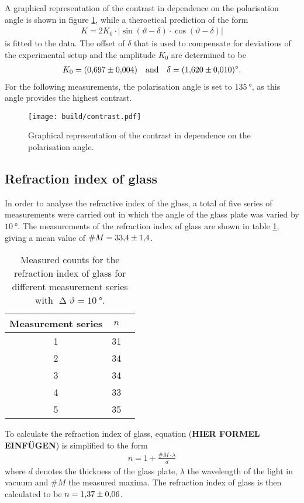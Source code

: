 \noindent
A graphical representation of the contrast in dependence on the polarisation angle is shown in figure \ref{fig:contrast}, while a theroetical prediction of the form
\begin{align}
    K = 2K_0\cdot|\sin(\vartheta-\delta)\cdot\cos(\vartheta-\delta)|
\end{align}
is fitted to the data.
The offset of $\delta$ that is used to compensate for deviations of the experimental setup and the amplitude $K_0$ are determined to be
\begin{align*}
    K_0=\SI{0.697\pm0.004}{} \quad \text{and} \quad \delta=\SI{1.620\pm0.010}{\degree}.
\end{align*}
For the following measurements, the polarisation angle is set to $\SI{135}{\degree}$, as this angle provides the highest contrast.
\begin{figure}[H]
    \centering
    \texttt{[image: build/contrast.pdf]}
    \caption{Graphical representation of the contrast in dependence on the polarisation angle.}
    \label{fig:contrast}
\end{figure}

\subsection{Refraction index of glass}
\label{subsec:refraction_glass}

In order to analyse the refractive index of the glass, a total of five series of measurements were carried out in which the angle of the glass plate was varied by $\SI{10}{\degree}$.
The measurements of the refraction index of glass are shown in table \ref{tab:refraction_glass}, giving a mean value of $\#M=\num{33.4\pm1.4}$.
\begin{table}[htbp]
    \centering
    \begin{tabular}{c c c}
        \toprule
        Measurement series & $n$ \\
        \midrule
        1 & 31 \\
        2 & 34 \\
        3 & 34 \\
        4 & 33 \\
        5 & 35 \\
        \bottomrule
    \end{tabular}
    \caption{Measured counts for the refraction index of glass for different measurement series with $\upDelta \vartheta=\SI{10}{\degree}$.}
    \label{tab:refraction_glass}
\end{table}
To calculate the refraction index of glass, equation (\textbf{HIER FORMEL EINFÜGEN}) is simplified to the form
\begin{align}
    n = 1+ \frac{\#M\cdot\lambda}{d}
\end{align}
where $d$ denotes the thickness of the glass plate, $\lambda$ the wavelength of the light in vacuum and $\#M$ the measured maxima.
The refraction index of glass is then calculated to be $n=\num{1.37\pm0.06}$. %

